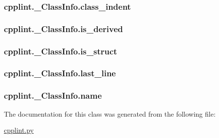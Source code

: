 \subsubsection[{\texorpdfstring{class\+\_\+indent}{class_indent}}]{\setlength{\rightskip}{0pt plus 5cm}cpplint.\+\_\+\+Class\+Info.\+class\+\_\+indent}\hypertarget{classcpplint_1_1__ClassInfo_adc7d328734cc58fe46a3a3f323a09f4a}{}\label{classcpplint_1_1__ClassInfo_adc7d328734cc58fe46a3a3f323a09f4a}
\subsubsection[{\texorpdfstring{is\+\_\+derived}{is_derived}}]{\setlength{\rightskip}{0pt plus 5cm}cpplint.\+\_\+\+Class\+Info.\+is\+\_\+derived}\hypertarget{classcpplint_1_1__ClassInfo_a8cace481686fbbb35a1da552646aa9f4}{}\label{classcpplint_1_1__ClassInfo_a8cace481686fbbb35a1da552646aa9f4}
\subsubsection[{\texorpdfstring{is\+\_\+struct}{is_struct}}]{\setlength{\rightskip}{0pt plus 5cm}cpplint.\+\_\+\+Class\+Info.\+is\+\_\+struct}\hypertarget{classcpplint_1_1__ClassInfo_a57b443f42838d73183921d661b6fe4ef}{}\label{classcpplint_1_1__ClassInfo_a57b443f42838d73183921d661b6fe4ef}
\subsubsection[{\texorpdfstring{last\+\_\+line}{last_line}}]{\setlength{\rightskip}{0pt plus 5cm}cpplint.\+\_\+\+Class\+Info.\+last\+\_\+line}\hypertarget{classcpplint_1_1__ClassInfo_a72e0f4576cdcb6f3886ed52e2affbc75}{}\label{classcpplint_1_1__ClassInfo_a72e0f4576cdcb6f3886ed52e2affbc75}
\subsubsection[{\texorpdfstring{name}{name}}]{\setlength{\rightskip}{0pt plus 5cm}cpplint.\+\_\+\+Class\+Info.\+name}\hypertarget{classcpplint_1_1__ClassInfo_a3de5f207d3449d735d15ebca779fe336}{}\label{classcpplint_1_1__ClassInfo_a3de5f207d3449d735d15ebca779fe336}


The documentation for this class was generated from the following file\+:\begin{DoxyCompactItemize}
\item 
\hyperlink{cpplint_8py}{cpplint.\+py}\end{DoxyCompactItemize}
